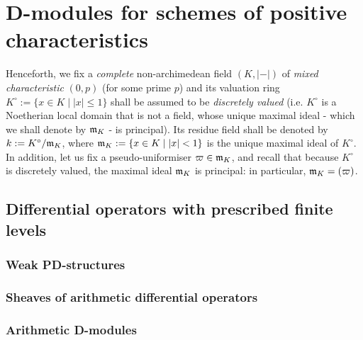 \section{D-modules for schemes of positive characteristics}
    \begin{convention} \label{conv: arithmetic_D_modules_for_schemes_over_perfect_fields_general_conventions}
        Henceforth, we fix a \textit{complete} non-archimedean field $(K, |-|)$ of \textit{mixed characteristic} $(0, p)$ (for some prime $p$) and its valuation ring $K^{\circ} := \{x \in K \mid |x| \leq 1\}$ shall be assumed to be \textit{discretely valued} (i.e. $K^{\circ}$ is a Noetherian local domain that is not a field, whose unique maximal ideal - which we shall denote by $\mathfrak{m}_K$ - is principal). Its residue field shall be denoted by $k := K^{\circ}/\mathfrak{m}_K$, where $\mathfrak{m}_K := \{x \in K \mid |x| < 1\}$ is the unique maximal ideal of $K^{\circ}$. In addition, let us fix a pseudo-uniformiser $\varpi \in \mathfrak{m}_K$, and recall that because $K^{\circ}$ is discretely valued, the maximal ideal $\mathfrak{m}_K$ is principal: in particular, $\mathfrak{m}_K = (\varpi)$.
    \end{convention}
    
    \subsection{Differential operators with prescribed finite levels}
        \subsubsection{Weak PD-structures}
        
        \subsubsection{Sheaves of arithmetic differential operators}
        
        \subsubsection{Arithmetic D-modules}
